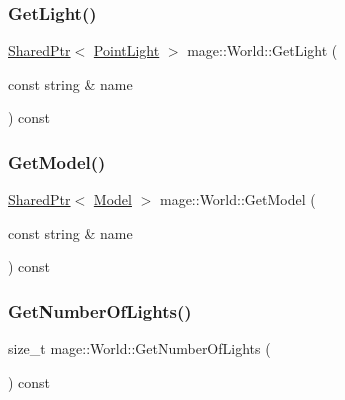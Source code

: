 \hypertarget{classmage_1_1_world_ac7c1a382b10e67bd42493af3966c9212}{}\label{classmage_1_1_world_ac7c1a382b10e67bd42493af3966c9212} 
\subsubsection{\texorpdfstring{Get\+Light()}{GetLight()}}
{\footnotesize\ttfamily \hyperlink{namespacemage_a1e01ae66713838a7a67d30e44c67703e}{Shared\+Ptr}$<$ \hyperlink{classmage_1_1_point_light}{Point\+Light} $>$ mage\+::\+World\+::\+Get\+Light (\begin{DoxyParamCaption}\item[{const string \&}]{name }\end{DoxyParamCaption}) const}

\hypertarget{classmage_1_1_world_ac91abee028df87d8879332e0df3d9e8a}{}\label{classmage_1_1_world_ac91abee028df87d8879332e0df3d9e8a} 
\subsubsection{\texorpdfstring{Get\+Model()}{GetModel()}}
{\footnotesize\ttfamily \hyperlink{namespacemage_a1e01ae66713838a7a67d30e44c67703e}{Shared\+Ptr}$<$ \hyperlink{classmage_1_1_model}{Model} $>$ mage\+::\+World\+::\+Get\+Model (\begin{DoxyParamCaption}\item[{const string \&}]{name }\end{DoxyParamCaption}) const}

\hypertarget{classmage_1_1_world_a786420d8d8b97065ee591753b7f1541b}{}\label{classmage_1_1_world_a786420d8d8b97065ee591753b7f1541b} 
\subsubsection{\texorpdfstring{Get\+Number\+Of\+Lights()}{GetNumberOfLights()}}
{\footnotesize\ttfamily size\+\_\+t mage\+::\+World\+::\+Get\+Number\+Of\+Lights (\begin{DoxyParamCaption}{ }\end{DoxyParamCaption}) const}

